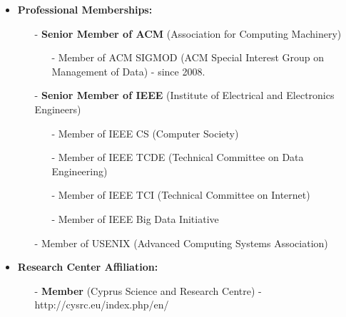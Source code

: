 \documentclass[10pt]{article}
\begin{document}
\begin{itemize}
\item  {\bf Professional Memberships:}
\begin{itemize}
\setlength{\itemsep}{0.10ex}
\item[-] {\bf Senior Member of ACM} (Association for Computing Machinery)
\begin{itemize}
\setlength{\itemsep}{0.10ex}
\item[-] Member of ACM SIGMOD (ACM Special Interest Group on Management of Data) - since 2008.
\end{itemize}
\item[-] {\bf Senior Member of IEEE} (Institute of Electrical and Electronics Engineers)
\begin{itemize}
\setlength{\itemsep}{0.10ex}
\item[-] Member of IEEE CS (Computer Society) 
\item[-] Member of IEEE TCDE (Technical Committee on Data Engineering)
\item[-] Member of IEEE TCI (Technical Committee on Internet)
\item[-] Member of IEEE Big Data Initiative
\end{itemize}
\item[-] Member of USENIX (Advanced Computing Systems Association)
\end{itemize}


\item  {\bf Research Center Affiliation:}
\begin{itemize}
\setlength{\itemsep}{0.10ex}
\item[-] {\bf Member} (Cyprus Science and Research Centre) - http://cysrc.eu/index.php/en/
\end{itemize}

\end{itemize}


\newpage
\renewcommand{\labelitemi}{$\bullet$}
\end{document}
